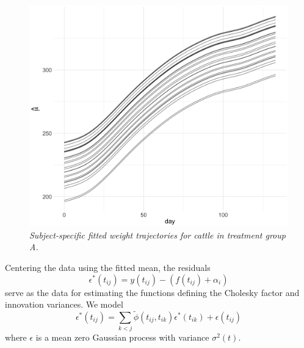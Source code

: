 %

\begin{figure}[H] 
\begin{center}
\includegraphics[width = .7\textwidth]{img/cattle/cattleA-weights-vs-time-mean-fit}
\caption{\textit{Subject-specific fitted weight trajectories for cattle in treatment group A. }}
\label{fig:cattleA-smoothed-weights-vs-time}
\end{center}
\end{figure} 
Centering the data using the fitted mean, the residuals 
\begin{equation} \label{eq:cattleA-dynamic-cond-mixed-model-2}
\epsilon^*\left(t_{ij}\right) = y\left(t_{ij}\right) - \left(f\left(t_{ij} \right) + \alpha_{i}\right)
\end{equation}
\noindent
serve as the data for estimating the functions defining the Cholesky factor and innovation variances. We model
\begin{equation} \label{eq:cattleA-dynamic-cond-mixed-model-1}
\epsilon^*\left(t_{ij}\right) = \sum_{k < j} \tilde{\phi}\left( t_{ij}, t_{ik} \right) \epsilon^*\left(t_{ik}\right) + \epsilon\left(t_{ij}\right)
\end{equation}
\noindent
where $\epsilon$ is a mean zero Gaussian process with variance $\sigma^2\left(t\right)$.

